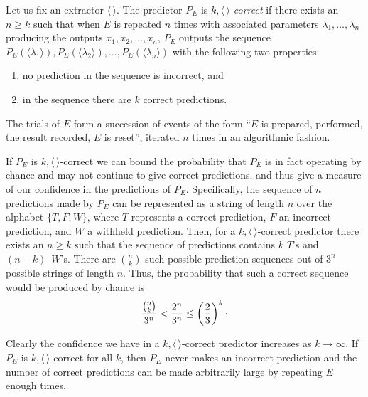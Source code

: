 \documentclass[%
 superscriptaddress,
 preprint,
 showpacs,
 showkeys,
 preprintnumbers,
  amsmath,amssymb,
  aps,
 pra,
  longbibliography,
  floatfix,
 ]{revtex4-1}
\theoremstyle{definition}
\newcommand{\rb}{\raisebox{0.5ex}}
\begin{document}
Let us fix an extractor $\langle \, \rangle$. The predictor $P_E$ is {\em $k,\langle \, \rangle$-correct} if there exists an $n\ge k$ such that when $E$ is repeated $n$ times with associated parameters $\lambda_1 ,\dots, \lambda_n$ producing the outputs $x_1,x_2,\dots ,x_n$, $P_E$ outputs the sequence $P_E(\langle\lambda_1\rangle), P_E(\langle\lambda_2\rangle),\dots ,P_E(\langle\lambda_n\rangle)$ with the following two properties:
\begin{enumerate}
\item no prediction in the sequence is incorrect, and
\item
in the sequence there are $k$ correct predictions.
\end{enumerate}
The trials of $E$ form a succession of events of the form ``$E$ is prepared, performed, the result recorded, $E$ is reset'', iterated $n$ times in an algorithmic fashion.

If $P_E$ is $k,\langle \, \rangle$-correct we can bound the probability that $P_E$ is in fact operating by chance and may not continue to give correct predictions, and thus give a measure of our confidence in the predictions of $P_E$.
Specifically, the sequence of $n$ predictions made by $P_E$ can be represented as a string of length $n$ over the alphabet $\{T,F,W\}$, where $T$ represents a correct prediction, $F$ an incorrect prediction, and $W$ a withheld prediction.
Then, for a $k,\langle \, \rangle$-correct predictor there exists an $n\ge k$ such that the sequence of predictions contains $k$ $T$'s and $(n-k)\,$ $W$'s.
There are ${n \choose k}$ such possible prediction sequences out of $3^n$ possible strings of length $n$.
Thus, the probability that such a correct sequence would be produced by chance is
$$\frac{{n\choose k}}{3^n}<\frac{2^n}{3^n}\le \left(\frac{2}{3}\right)^k\rb.$$

Clearly the confidence we have in a $k,\langle \, \rangle$-correct predictor increases as $k\to\infty$.
If $P_E$ is $k,\langle \, \rangle$-correct for all $k$, then $P_E$ never makes an incorrect prediction and the number of correct predictions can be made arbitrarily large by repeating $E$ enough times.
\end{document}
